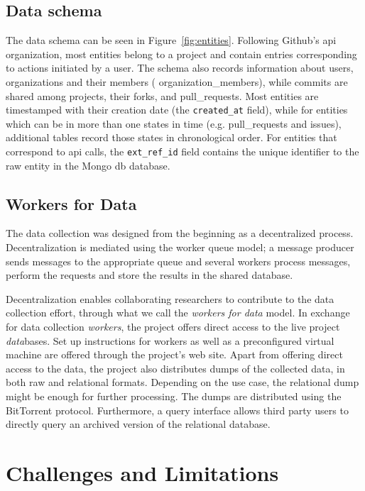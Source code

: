 \documentclass[conference]{IEEEtran}
\begin{document}
\subsection*{Data schema}

The data schema can be seen in Figure~\ref{fig:entities}. Following Github's
{\sc api} organization, most entities belong to a {\sf project} and contain
entries corresponding to actions initiated by a {\sf user}. The schema also
records information about {\sf users}, organizations and their members ({\sf
organization\_members}), while {\sf commits} are shared among {\sf projects}, their
forks, and {\sf pull\_requests}.  Most entities are timestamped with their
creation date (the \texttt{created\_at} field), while for entities which can be
in more than one states in time (e.g.  {\sf pull\_requests} and {\sf issues}),
additional tables record those states in chronological order.  
For entities that correspond to {\sc api} calls, the \texttt{ext\_ref\_id}
field contains the unique identifier to the raw entity in the Mongo{\sc
db} database.

\subsection*{Workers for Data}

The data collection was designed from the beginning as a decentralized process.
Decentralization is mediated using the worker queue model; a message producer
sends messages to the appropriate queue and several workers process messages,
perform the requests and store the results in the shared database.

Decentralization enables collaborating researchers to contribute to the data
collection effort, through what we call the \emph{workers for data} model.  In
exchange for data collection \emph{workers}, the project offers direct access to
the live project \emph{data}bases. Set up instructions for workers as well as a
preconfigured virtual machine are offered through the project's web site. Apart
from offering direct access to the data, the project also distributes dumps of
the collected data, in both raw and relational formats. Depending on the use
case, the relational dump might be enough for further processing. The dumps are
distributed using the BitTorrent protocol. Furthermore, a query interface
allows third party users to directly query an archived version of the relational
database.

\section{Challenges and Limitations}
\end{document}
